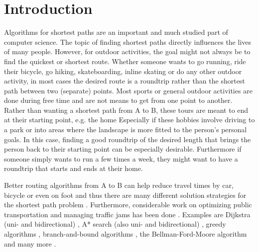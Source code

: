 \chapter{Introduction}
\label{chapter:introduction}


Algorithms for shortest paths are an important and much studied part of computer science.
The topic of finding shortest paths directly influences the lives of many people.
However, for outdoor activities, the goal might not always be to find the quickest or shortest route.
Whether someone wants to go running, ride their bicycle, go hiking, skateboarding, inline skating or do any other outdoor activity, in most cases the desired route is a roundtrip rather than the shortest path between two (separate) points.
Most sports or general outdoor activities are done during free time and are not means to get from one point to another.
Rather than wanting a shortest path from A to B, these tours are meant to end at their starting point, e.g. the home
Especially if these hobbies involve driving to a park or into areas where the landscape is more fitted to the person's personal goals.
In this case, finding a good roundtrip of the desired length that brings the person back to their starting point can be especially desirable.
Furthermore if someone simply wants to run a few times a week, they might want to have a roundtrip that starts and ends at their home. 


Better routing algorithms from A to B can help reduce travel times by car, bicycle or even on foot and thus there are many different solution strategies for the shortest path problem \cite{cherkassky_shortest_1996, deo_shortest-path_1984, gallo_shortest_1988, madkour_survey_2017, sommer_shortest-path_2014, wayahdi_greedy_2021}.
Furthermore, considerable work on optimizing public transportation \cite{bast_route_2016, delling_round-based_2015} and managing traffic jams has been done \cite{delling_time-dependent_2011, delling_customizable_2017}. 
Examples are Dijkstra (uni- and bidirectional) \cite{madkour_survey_2017, sommer_shortest-path_2014, wayahdi_greedy_2021}, A* search (also uni- and bidirectional) \cite{madkour_survey_2017, sommer_shortest-path_2014, wayahdi_greedy_2021}, greedy algorithms \cite{madkour_survey_2017, wayahdi_greedy_2021}, branch-and-bound algorithms \cite{lawler_branch-and-bound_1966}, the Bellman-Ford-Moore algorithm \cite{cherkassky_shortest_1996} and many more \cite{delling_engineering_2009, gallo_shortest_1988, sommer_shortest-path_2014}.

